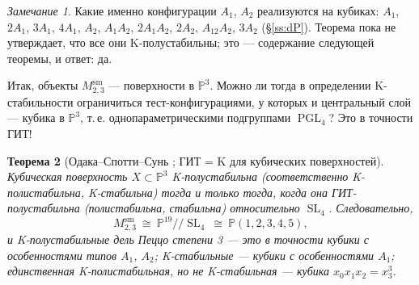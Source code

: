 \documentclass[11pt,a4paper]{article}
\theoremstyle{plain}
\newtheorem{theorem}{Теорема}[section]
\theoremstyle{definition}
\theoremstyle{remark}
\newtheorem{remark}[theorem]{Замечание}
\newcommand{\PP}{\mathbb{P}}
\DeclareMathOperator{\SL}{SL}
\DeclareMathOperator{\PGL}{PGL}
\newcommand{\sm}{\mathrm{sm}}
\begin{document}
\begin{remark}
Какие именно конфигурации $A_1$, $A_2$ реализуются на кубиках: $A_1$, $2A_1$, $3A_1$, $4A_1$,
$A_2$, $A_1A_2$, $2A_1A_2$, $2A_2$, $A_12A_2$, $3A_2$ (\S\ref{ss:dP}). Теорема пока не утверждает, что
все они K-полустабильны; это --- содержание следующей теоремы, и ответ: да.
\end{remark}

Итак, объекты $M^{\sm}_{2,3}$ --- поверхности в $\PP^3$. Можно ли тогда в определении K-стабильности
ограничиться тест-конфигурациями, у которых и центральный слой --- кубика в $\PP^3$, т.\,е.
однопараметрическими подгруппами $\PGL_4$? Это в точности ГИТ!

\begin{theorem}[{Одака--Спотти--Сунь \cite{OSS}; ГИТ = K для кубических поверхностей}]\label{thm:GIT=K}
Кубическая поверхность $X\subset\PP^3$ K-полустабильна (соответственно K-полистабильна, K-стабильна)
тогда и только тогда, когда она ГИТ-полустабильна (полистабильна, стабильна) относительно $\SL_4$.
Следовательно,
\[
M^{\sm}_{2,3}\ \cong\ \PP^{19}/\!/\SL_4\ \cong\ \PP(1,2,3,4,5),
\]
и K-полустабильные дель Пеццо степени 3 --- это в точности кубики с особенностями типов $A_1$, $A_2$;
K-стабильные --- кубики с особенностями $A_1$; единственная K-полистабильная, но не K-стабильная ---
кубика $x_0x_1x_2=x_3^3$.
\end{theorem}
\end{document}
